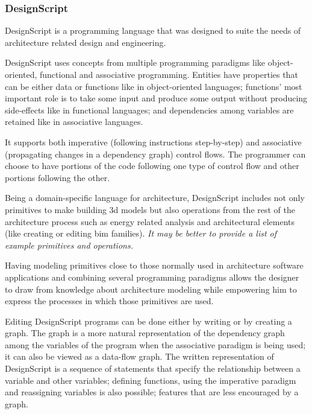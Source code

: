 \documentclass{./llncs2e/llncs}
\begin{document}
\subsubsection{DesignScript\cite{aish2012designscript}}
	DesignScript is a programming language that was designed to suite the needs of architecture related design and engineering.
	
	DesignScript uses concepts from multiple programming paradigms like object-oriented, functional and associative programming. 
	Entities have properties that can be either data or functions like in object-oriented languages; functions' most important role is to take some input and produce some output without producing side-effects like in functional languages; and dependencies among variables are retained like in associative languages.
	
	It supports both imperative (following instructions step-by-step) and associative (propagating changes in a dependency graph) control flows. 
	The programmer can choose to have portions of the code following one type of control flow and other portions following the other.
	
	Being a domain-specific language for architecture, DesignScript includes not only primitives to make building 3d models but also operations from the rest of the architecture process such as energy related analysis and architectural elements (like creating or editing \ac{bim} families).
	\emph{It may be better to provide a list of example primitives and operations.}
	
	Having modeling primitives close to those normally used in architecture software applications and combining several programming paradigms allows the designer to draw from knowledge about architecture modeling while empowering him to express the processes in which those primitives are used.
	
	Editing DesignScript programs can be done either by writing or by creating a graph. 
	The graph is a more natural representation of the dependency graph among the variables of the program when the associative paradigm is being used; it can also be viewed as a data-flow graph. 
	The written representation of DesignScript is a sequence of statements that specify the relationship between a variable and other variables; defining functions, using the imperative paradigm and reassigning variables is also possible; features that are less encouraged by a graph.
	
\end{document}
